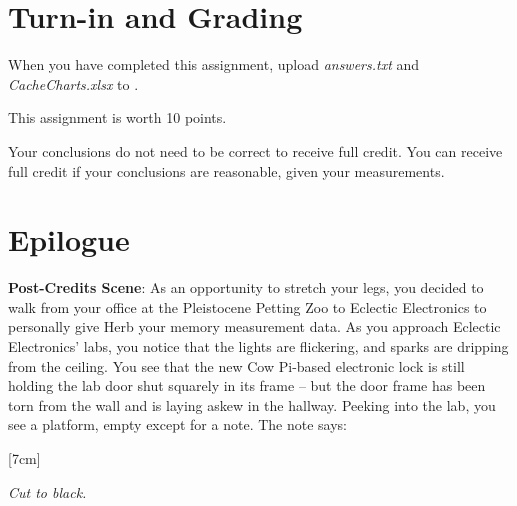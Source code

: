 \section*{Turn-in and Grading}

When you have completed this assignment, upload \textit{answers.txt} and
\textit{CacheCharts.xlsx} to \filesubmission.

This assignment is worth 10 points. \\

\begin{description}
\end{description}

Your conclusions do not need to be correct to receive full credit. You can
receive full credit if your conclusions are reasonable, given your measurements.



\section*{Epilogue}

{\large \textbf{Post-Credits Scene}:} As an opportunity to stretch your legs,
you decided to walk from your office at the Pleistocene Petting Zoo to Eclectic
Electronics to personally give Herb your memory measurement data. As you
approach Eclectic Electronics' labs, you notice that the lights are flickering,
and sparks are dripping from the ceiling. You see that the new Cow Pi-based
electronic lock is still holding the lab door shut squarely in its frame -- but
the door frame has been torn from the wall and is laying askew in the hallway.
Peeking into the lab, you see a platform, empty except for a note. The note says:

\begin{center}[7cm]\end{center}

\textit{Cut to black.}


